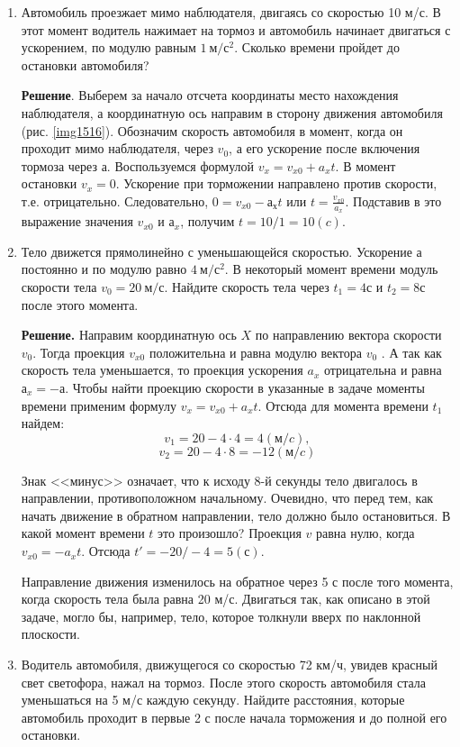 \documentclass[a6paper, 11pt]{diss_4}
\renewcommand{\'}{\,'}
\begin{document}
\begin{enumerate}

\item { Автомобиль проезжает мимо наблюдателя, двигаясь со скоростью 10 м/с. В этот
момент водитель нажимает на тормоз и автомобиль начинает двигаться с
ускорением, по модулю равным $1\ м/с^2$. Сколько времени пройдет до остановки
автомобиля?

  \textbf{Решение}. Выберем за начало отсчета координаты место нахождения
наблюдателя, а координатную ось направим в сторону движения автомобиля (рис.
\ref{img1516}). Обозначим скорость автомобиля в момент, когда он проходит мимо
наблюдателя, через $v_0$, а его ускорение после включения тормоза через $а$.
Воспользуемся формулой $v_x=v_{x0}+a_xt$. В момент остановки $v_x= 0$.
Ускорение при торможении направлено против скорости, т.е. отрицательно.
Следовательно, $0 = v_{x0}-а_{х}t $ или $t = \frac{v_{x0}}{a_x}$. Подставив в
это выражение значения $v_{x0}$ и $а_x$, получим $t = 10/1=10(c)$.
}

\item {
  Тело движется прямолинейно с уменьшающейся скоростью. Ускорение $а$ постоянно
и по модулю равно $4\ м/с^2$. В некоторый момент времени модуль скорости тела
$v_0 =20\ м/с$. Найдите скорость тела через $t_1=4с$ и $t_2=8с$ после этого
момента.

\textbf{Решение.} Направим координатную ось $X$ по направлению вектора скорости
$v_0$. Тогда проекция $v_{x0}$ положительна и равна модулю вектора $v_0$ . А так как
скорость тела уменьшается, то проекция ускорения $a_x$ отрицательна и равна $а_x=-а$.
Чтобы найти проекцию скорости в указанные в задаче моменты времени
применим формулу $v_x=v_{x0}+a_xt$. Отсюда для момента времени $t_1$ найдем:
\[v_1=20-4\cdot 4 = 4(м/c),\]
\[v_2=20-4\cdot 8 = -12(м/c)\]

  Знак <<минус>> означает, что к исходу 8-й секунды тело двигалось в
направлении, противоположном начальному. Очевидно, что перед тем, как начать
движение в обратном направлении, тело должно было остановиться. В какой
момент времени $t$ это произошло? Проекция $v$ равна нулю, когда
$v_{x0}=-a_{x}t$. Отсюда $t'=-20/-4=5(с)$.

 Направление движения изменилось на обратное через 5 с после того момента, когда
скорость тела была равна 20 м/с. Двигаться так, как описано в этой задаче,
могло бы, например, тело, которое толкнули вверх по наклонной плоскости.
}
\item {
 Водитель автомобиля, движущегося со скоростью 72 км/ч, увидев красный свет
светофора, нажал на тормоз. После этого скорость автомобиля стала уменьшаться
на 5 м/с каждую секунду. Найдите расстояния, которые автомобиль проходит в
первые 2 с после начала торможения и до полной его остановки.

}
\end{enumerate}
\end{document}
